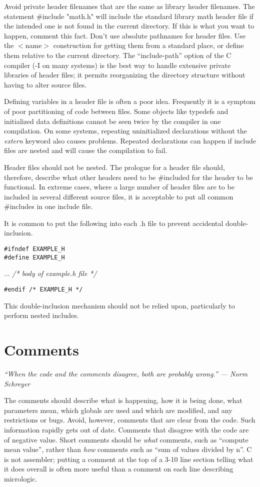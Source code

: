  Avoid private header filenames that are the same as library header filenames.
The statement {\cd \#include "math.h"} will include the standard library math
header file if the intended one is not found in the current directory. If this
is what you want to happen, comment this fact. Don't use absolute pathnames for
header files. Use the $<$name$>$ construction for getting them from a standard
place, or define them relative to the current directory. The ``include-path''
option of the C compiler (-I on many systems) is the best way to handle
extensive private libraries of header files; it permits reorganizing the
directory structure without having to alter source files. 

 Defining variables in a header file is often a poor idea. Frequently it is a
symptom of poor partitioning of code between files. Some objects like typedefs
and initialized data definitions cannot be seen twice by the compiler in one
compilation. On some systems, repeating uninitialized declarations without
the {\em extern} keyword also causes problems. Repeated declarations can happen
if include files are nested and will cause the compilation to fail. 

 Header files should not be nested. The prologue for a header file should,
therefore, describe what other headers need to be \#included for the header to
be functional. In extreme cases, where a large number of header files are to be
included in several different source files, it is acceptable to put all common
\#includes in one include file. 

 It is common to put the following into each .h file to prevent accidental
double-inclusion. 
\begin{verbatim}
#ifndef EXAMPLE_H
#define EXAMPLE_H
\end{verbatim}
  ... {\em /* body of example.h file */}
\begin{verbatim}
#endif /* EXAMPLE_H */ 
\end{verbatim}

This double-inclusion mechanism should not be relied upon, particularly to
perform nested includes. 

\section{Comments}

{\em ``When the code and the comments disagree, both are probably wrong.'' ---
Norm Schreyer}

\bigskip\noindent
 The comments should describe what is happening, how it is being done, what
parameters mean, which globals are used and which are modified, and any
restrictions or bugs. Avoid, however, comments that are clear from the code.
Such information rapidly gets out of date. Comments that disagree with the code
are of negative value. Short comments should be {\em what} comments, such as
``compute mean value'', rather than {\em how} comments such as ``sum of values
divided by n''. C is not assembler; putting a comment at the top of a 3-10 line
section telling what it does overall is often more useful than a comment on
each line describing micrologic. 

